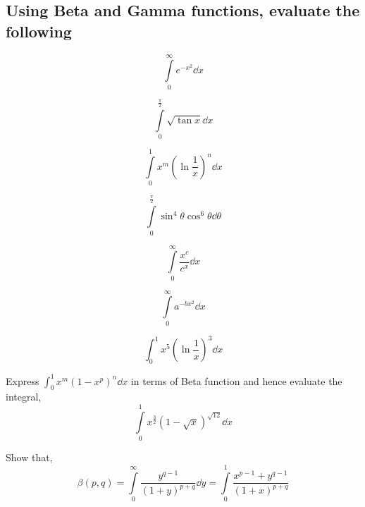 \subsection{Using Beta and Gamma functions, evaluate the following}
\begin{asign}
	\[\int\limits_0^\infty e^{-x^2}\dd{x}\]
\end{asign}
\begin{asign}
	\[\int\limits_0^\frac{\pi}{2}\sqrt{\tan x}\dd{x}\]
\end{asign}
\begin{asign}
	\[\int\limits_0^1x^m\left(\ln\frac{1}{x}\right)^n\dd{x}\]
\end{asign}
\begin{asign}
	\[\int\limits_0^\frac{\pi}{2}\sin^4\theta\cos^6\theta\dd{\theta}\]
\end{asign}
\begin{asign}
	\[\int\limits_0^\infty\frac{x^c}{c^x}\dd{x}\]
\end{asign}
\begin{asign}
	\[\int\limits_0^\infty a^{-bx^2}\dd{x}\]
\end{asign}
\begin{asign}
	\[\int_0^1x^5\left(\ln\frac{1}{x}\right)^3\dd{x}\]
\end{asign}
\begin{asign}
	Express $\int_0^1x^m(1-x^p)^n\dd{x}$ in terms of Beta function and hence evaluate the integral,
	\[\int\limits_0^1 x^\frac{3}{2}(1-\sqrt{x})^{\sqrt{12}} \dd{x}\]
\end{asign}
\begin{asign}
	Show that,
	\[\beta(p,q)=\int\limits_0^\infty\frac{y^{q-1}}{(1+y)^{p+q}}\dd{y}=\int\limits_0^1\frac{x^{p-1}+y^{q-1}}{(1+x)^{p+q}}\]
\end{asign}



















